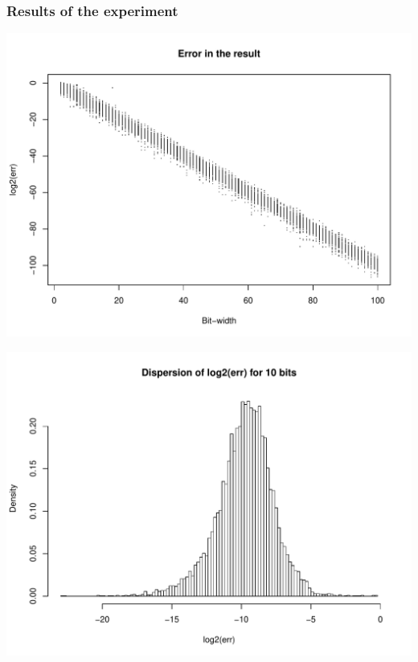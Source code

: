 \documentclass[serif, 12pt]{beamer}
\begin{document}
\begin{frame}
\frametitle{Results of the experiment}

\begin{adjustwidth}{-2em}{-2em}
\centering
\includegraphics[scale=0.55]{../../src/err.pdf}
\end{adjustwidth}

\end{frame}


\begin{frame}

\begin{adjustwidth}{-2em}{-2em}
\centering
\includegraphics[width=\linewidth]{../../src/err10.pdf}
\end{adjustwidth}

\end{frame}
\end{document}
